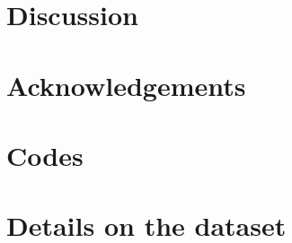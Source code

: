 \documentclass[11pt]{amsart}
\begin{document}
\section{Discussion}


\section*{Acknowledgements}

\section*{Codes}


\appendix
\section{Details on the dataset}
\end{document}
